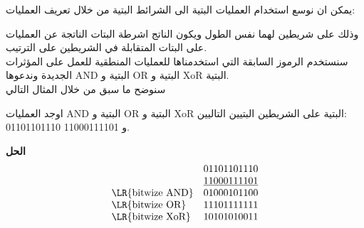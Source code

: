 \begin{note}
	يمكن ان نوسع استخدام العمليات البتية الى الشرائط البتية من خلال تعريف العمليات:
\begin{center}
\end{center}
وذلك على شريطين لهما نفس الطول ويكون الناتج اشرطة البتات الناتجة عن العمليات  على البتات المتقابلة في الشريطين على الترتيب.\\
سنستخدم الرموز السابقة التي استخدمناها للعمليات المنطقية للعمل على المؤثرات الجديدة 	 وندعوها AND البتية و OR البتية و XoR البتية.\\
سنوضح ما سبق من خلال المثال التالي
\end{note}
\begin{example}
	اوجد العمليات  AND البتية و OR البتية و XoR البتية على الشريطين البتيين التاليين:\\
	01101101110 و 11000111101.
\end{example}
\noindent
\textbf{الحل}
\[
\begin{array}{lc}
	& 01101101110 \\
	& \underline{11000111101}\\
\text{\LR{bitwize AND}} & 01000101100\\
\text{\LR{bitwize OR}} & 11101111111\\
\text{\LR{bitwize XoR}} & 10101010011
\end{array}
\]

